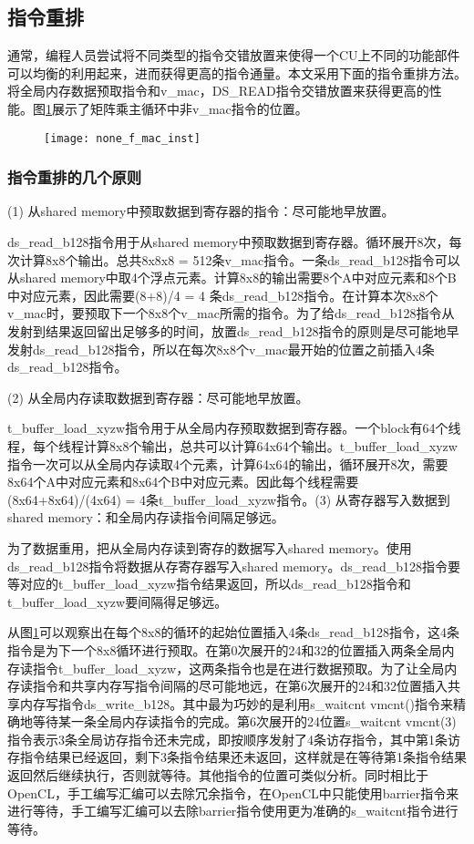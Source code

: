 \subsection{指令重排}
通常，编程人员尝试将不同类型的指令交错放置来使得一个CU上不同的功能部件可以均衡的利用起来，进而获得更高的指令通量。本文采用下面的指令重排方法。将全局内存数据预取指令和v\_mac，DS\_READ指令交错放置来获得更高的性能。图\ref{fig:none_f_mac_inst}展示了矩阵乘主循环中非v\_mac指令的位置。
\begin{figure}[htbp]
	\centering
	\texttt{[image: none\_f\_mac\_inst]}
	\label{fig:none_f_mac_inst}
\end{figure}
\subsubsection{指令重排的几个原则}
(1) 从shared memory中预取数据到寄存器的指令：尽可能地早放置。

ds\_read\_b128指令用于从shared memory中预取数据到寄存器。循环展开8次，每次计算8x8个输出。总共8x8x8 = 512条v\_mac指令。一条ds\_read\_b128指令可以从shared memory中取4个浮点元素。计算8x8的输出需要8个A中对应元素和8个B中对应元素，因此需要(8+8)/4 = 4 条ds\_read\_b128指令。在计算本次8x8个v\_mac时，要预取下一个8x8个v\_mac所需的指令。为了给ds\_read\_b128指令从发射到结果返回留出足够多的时间，放置ds\_read\_b128指令的原则是尽可能地早发射ds\_read\_b128指令，所以在每次8x8个v\_mac最开始的位置之前插入4条ds\_read\_b128指令。

(2) 从全局内存读取数据到寄存器：尽可能地早放置。

t\_buffer\_load\_xyzw指令用于从全局内存预取数据到寄存器。一个block有64个线程，每个线程计算8x8个输出，总共可以计算64x64个输出。t\_buffer\_load\_xyzw指令一次可以从全局内存读取4个元素，计算64x64的输出，循环展开8次，需要8x64个A中对应元素和8x64个B中对应元素。因此每个线程需要(8x64+8x64)/(4x64) = 4条t\_buffer\_load\_xyzw指令。(3) 从寄存器写入数据到shared memory：和全局内存读指令间隔足够远。

为了数据重用，把从全局内存读到寄存的数据写入shared memory。使用ds\_read\_b128指令将数据从存寄存器写入shared memory。ds\_read\_b128指令要等对应的t\_buffer\_load\_xyzw指令结果返回，所以ds\_read\_b128指令和t\_buffer\_load\_xyzw要间隔得足够远。

从图\ref{fig:none_f_mac_inst}可以观察出在每个8x8的循环的起始位置插入4条ds\_read\_b128指令，这4条指令是为下一个8x8循环进行预取。在第0次展开的24和32的位置插入两条全局内存读指令t\_buffer\_load\_xyzw，这两条指令也是在进行数据预取。为了让全局内存读指令和共享内存写指令间隔的尽可能地远，在第6次展开的24和32位置插入共享内存写指令ds\_write\_b128。其中最为巧妙的是利用s\_waitcnt vmcnt()指令来精确地等待某一条全局内存读指令的完成。第6次展开的24位置s\_waitcnt vmcnt(3)指令表示3条全局访存指令还未完成，即按顺序发射了4条访存指令，其中第1条访存指令结果已经返回，剩下3条指令结果还未返回，这样就是在等待第1条指令结果返回然后继续执行，否则就等待。其他指令的位置可类似分析。同时相比于OpenCL，手工编写汇编可以去除冗余指令，在OpenCL中只能使用barrier指令来进行等待，手工编写汇编可以去除barrier指令使用更为准确的s\_waitcnt指令进行等待。


